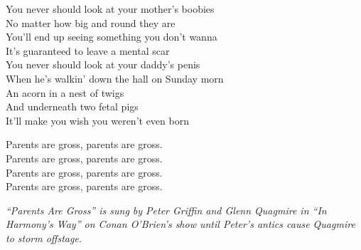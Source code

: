 \vspace{10pt}
You never should look at your mother's boobies\\
No matter how big and round they are\\
You'll end up seeing something you don't wanna\\
It's guaranteed to leave a mental scar\\
You never should look at your daddy's penis\\
When he's walkin' down the hall on Sunday morn\\
An acorn in a nest of twigs\\
And underneath two fetal pigs\\
It'll make you wish you weren't even born\par
\vspace{10pt}
Parents are gross, parents are gross.\\
Parents are gross, parents are gross.\\
Parents are gross, parents are gross.\\
Parents are gross, parents are gross.\\
\par
\vspace{10pt}
{\footnotesize\textit{``Parents Are Gross'' is sung by Peter Griffin and Glenn Quagmire in ``In Harmony's Way'' on Conan O'Brien's show until Peter's antics cause Quagmire to storm offstage.}}
